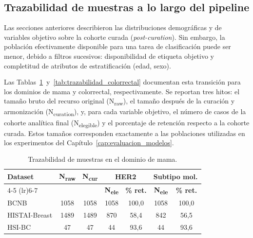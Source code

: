 \subsection{Trazabilidad de muestras a lo largo del pipeline}
\label{sec:trazabilidad_muestras}

Las secciones anteriores describieron las distribuciones demográficas y de variables objetivo sobre la cohorte curada (\textit{post-curation}). Sin embargo, la población efectivamente disponible para una tarea de clasificación puede ser menor, debido a filtros sucesivos: disponibilidad de etiqueta objetivo y completitud de atributos de estratificación (edad, sexo).

Las Tablas~\ref{tab:trazabilidad_mama}~y~\ref{tab:trazabilidad_colorrectal} documentan esta transición para los dominios de mama y colorrectal, respectivamente. Se reportan tres hitos: el tamaño bruto del recurso original (N\textsubscript{raw}), el tamaño después de la curación y armonización (N\textsubscript{curation}), y, para cada variable objetivo, el número de casos de la cohorte analítica final (N\textsubscript{elegible}) y el porcentaje de retención respecto a la cohorte curada. Estos tamaños corresponden exactamente a las poblaciones utilizadas en los experimentos del Capítulo~\ref{cap:evaluacion_modelos}.

\begin{table}[htbp]
\centering
\caption{Trazabilidad de muestras en el dominio de mama.}
\label{tab:trazabilidad_mama}
\footnotesize
\setlength{\tabcolsep}{4pt}
\begin{tabular}{lcccccc}
\toprule
\multirow{2}{*}{\textbf{Dataset}} & \multirow{2}{*}{\textbf{N\textsubscript{raw}}} & \multirow{2}{*}{\textbf{N\textsubscript{cur}}}
  & \multicolumn{2}{c}{\textbf{HER2}} & \multicolumn{2}{c}{\textbf{Subtipo mol.}} \\
\cmidrule(lr){4-5} \cmidrule(lr){6-7}
& & & \textbf{N\textsubscript{ele}} & \textbf{\% ret.} & \textbf{N\textsubscript{ele}} & \textbf{\% ret.} \\
\midrule
BCNB & 1058 & 1058 & 1058 & 100,0 & 1058 & 100,0 \\
HISTAI-Breast & 1489 & 1489 & 870 & 58,4 & 842 & 56,5 \\
HSI-BC & 47 & 47 & 44 & 93,6 & 44 & 93,6 \\
\bottomrule
\end{tabular}
\end{table}

